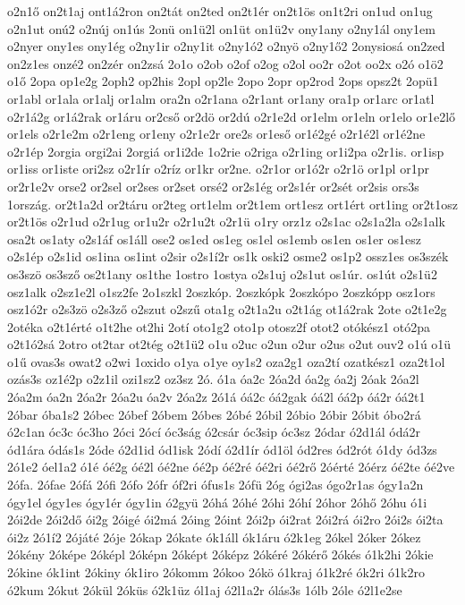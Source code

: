 {o2n1ő
on2t1aj
ont1á2ron
on2tát
on2ted
on2t1ér
on2t1ös
on1t2ri
on1ud
on1ug
o2n1ut
onú2
o2núj
on1ús
2onü
on1ü2l
on1üt
on1ü2v
ony1any
o2ny1ál
ony1em
o2nyer
ony1es
ony1ég
o2ny1ir
o2ny1it
o2ny1ó2
o2nyö
o2ny1ő2
2onysiosá
on2zed
on2z1es
onzé2
on2zér
on2zsá
2o1o
o2ob
o2of
o2og
o2ol
oo2r
o2ot
oo2x
o2ó
o1ö2
o1ő
2opa
op1e2g
2oph2
op2his
2opl
op2le
2opo
2opr
op2rod
2ops
opsz2t
2opü1
or1abl
or1ala
or1alj
or1alm
ora2n
o2r1ana
o2r1ant
or1any
ora1p
or1arc
or1atl
o2r1á2g
or1á2rak
or1áru
or2cső
or2dö
or2dú
o2r1e2d
or1elm
or1eln
or1elo
or1e2lő
or1els
o2r1e2m
o2r1eng
or1eny
o2r1e2r
ore2s
or1eső
or1é2gé
o2r1é2l
or1é2ne
o2r1ép
2orgia
orgi2ai
2orgiá
or1i2de
1o2rie
o2riga
o2r1ing
or1i2pa
o2r1is.
or1isp
or1iss
or1iste
ori2sz
o2r1ír
o2ríz
or1kr
or2ne.
o2r1or
or1ó2r
o2r1ö
or1pl
or1pr
or2r1e2v
orse2
or2sel
or2ses
or2set
orsé2
or2s1ég
or2s1ér
or2sét
or2sis
ors3s
1ország.
or2t1a2d
or2táru
or2teg
ort1elm
or2t1em
ort1esz
ort1ért
ort1ing
or2t1osz
or2t1ös
o2r1ud
o2r1ug
or1u2r
o2r1u2t
o2r1ü
o1ry
orz1z
o2s1ac
o2s1a2la
o2s1alk
osa2t
os1aty
o2s1áf
os1áll
ose2
os1ed
os1eg
os1el
os1emb
os1en
os1er
os1esz
o2s1ép
o2s1id
os1ina
os1int
o2sir
o2s1í2r
os1k
oski2
osme2
os1p2
ossz1es
os3szék
os3szö
os3sző
os2t1any
os1the
1ostro
1ostya
o2s1uj
o2s1ut
os1úr.
os1út
o2s1ü2
osz1alk
o2sz1e2l
o1sz2fe
2o1szkl
2oszkóp.
2oszkópk
2oszkópo
2oszkópp
osz1ors
osz1ó2r
o2s3zö
o2s3ző
o2szut
o2szű
ota1g
o2t1a2u
o2t1ág
ot1á2rak
2ote
o2t1e2g
2otéka
o2t1érté
o1t2he
ot2hi
2otí
oto1g2
oto1p
otosz2f
otot2
otókész1
otó2pa
o2t1ó2sá
2otro
ot2tar
ot2tég
o2t1ü2
o1u
o2uc
o2un
o2ur
o2us
o2ut
ouv2
o1ú
o1ü
o1ű
ovas3s
owat2
o2wi
1oxido
o1ya
o1ye
oy1s2
oza2g1
oza2tí
ozatkész1
oza2t1ol
ozás3s
oz1é2p
o2z1il
ozi1sz2
oz3sz
2ó.
ó1a
óa2c
2óa2d
óa2g
óa2j
2óak
2óa2l
2óa2m
óa2n
2óa2r
2óa2u
óa2v
2óa2z
2ó1á
óá2c
óá2gak
óá2l
óá2p
óá2r
óá2t1
2óbar
óba1s2
2óbec
2óbef
2óbem
2óbes
2óbé
2óbil
2óbio
2óbir
2óbit
óbo2rá
ó2c1an
óc3c
óc3ho
2óci
2ócí
óc3ság
ó2csár
óc3sip
óc3sz
2ódar
ó2d1ál
ódá2r
ód1ára
ódás1s
2óde
ó2d1id
ód1isk
2ódí
ó2d1ír
ód1öl
ód2res
ód2rót
ó1dy
ód3zs
2ó1e2
óel1a2
ó1é
óé2g
óé2l
óé2ne
óé2p
óé2ré
óé2ri
óé2rő
2óérté
2óérz
óé2te
óé2ve
2ófa.
2ófae
2ófá
2ófi
2ófo
2ófr
óf2ri
ófus1s
2ófü
2óg
ógi2as
ógo2r1as
ógy1a2n
ógy1el
ógy1es
ógy1ér
ógy1in
ó2gyü
2óhá
2óhé
2óhi
2óhí
2óhor
2óhő
2óhu
ó1i
2ói2de
2ói2dő
ói2g
2óigé
ói2má
2óing
2óint
2ói2p
ói2rat
2ói2rá
ói2ro
2ói2s
ói2ta
ói2z
2ó1í2
2ójáté
2óje
2ókap
2ókate
ók1áll
ók1áru
ó2k1eg
2ókel
2óker
2ókez
2ókény
2óképe
2óképl
2óképn
2óképt
2óképz
2ókéré
2ókérő
2ókés
ó1k2hi
2ókie
2ókine
ók1int
2ókiny
ók1iro
2ókomm
2ókoo
2ókö
ó1kraj
ó1k2ré
ók2ri
ó1k2ro
ó2kum
2ókut
2ókül
2óküs
ó2k1üz
ól1aj
ó2l1a2r
ólás3s
1ólb
2óle
ó2l1e2se
}
